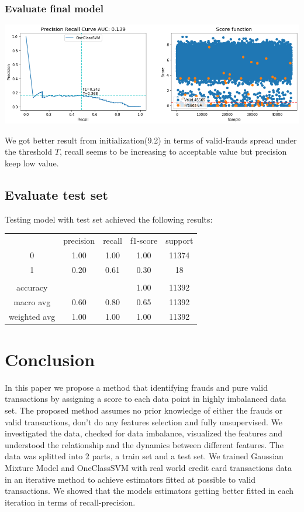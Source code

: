 \documentclass[20pt,a4paper]{article}
\begin{document}
\subsubsection{Evaluate final model}

    \begin{center}
    \includegraphics[scale=0.45]{graphs/output_72_0.png}
    \end{center}
    
    We got better result from initialization(9.2) in terms of valid-frauds spread
under the threshold \(T\), recall seems to be increasing to acceptable
value but precision keep low value.

\subsection{Evaluate test set}
Testing model with test set achieved the following results:
\begin{center}
    \begin{tabular}{ c c c c c}
          & precision & recall & f1-score &  support\\ 
         0 & 1.00 & 1.00 & 1.00 & 11374\\
         1 & 0.20 & 0.61 & 0.30 & 18\\
         \\
         accuracy & & & 1.00 & 11392\\
         macro avg & 0.60 & 0.80 & 0.65 & 11392\\
         weighted avg & 1.00 & 1.00 & 1.00 & 11392
    \end{tabular}
\end{center}

\section{Conclusion}
In this paper we propose a method that identifying frauds and pure valid transactions by assigning a score to each data point in highly imbalanced data set. The proposed method assumes no prior knowledge of either the frauds or valid transactions, don't do any features selection and fully unsupervised. We investigated the data, checked for data imbalance, visualized the features and understood the relationship and the dynamics between different features. The data was splitted into 2 parts, a train set and a test set. We trained Gaussian Mixture Model and OneClassSVM with real world credit card transactions data in an iterative method to achieve estimators fitted at possible to valid transactions. We showed that the models estimators getting better fitted in each iteration in terms of recall-precision. 
\end{document}
